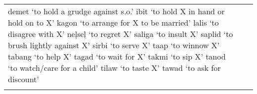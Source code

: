 \begin{table}
{\begin{tabular} {
        >{\RaggedRight\arraybackslash}p{4.55cm}
        >{\RaggedRight\arraybackslash}p{4.1cm}
        >{\RaggedRight\arraybackslash}p{4.2cm}
                    }
demet ‘to hold a grudge against s.o.’\newline 
ibit ‘to hold X in hand or hold on to X’\newline 
kagon ‘to arrange for X to be married’\newline 
lalis ‘to disagree with X’\newline 
neļseļ ‘to regret X’\newline 
saliga ‘to insult X’\newline 
saplid ‘to brush lightly against X’\newline 
sirbi ‘to serve X’\newline 
taap ‘to winnow X’\newline 
tabang ‘to help X’\newline 
tagad ‘to wait for X’\newline 
takmi ‘to sip X’\newline 
tanod ‘to watch/care for a child’\newline 
tilaw ‘to taste X’\newline 
tawad ‘to ask for discount’ \\ %
\lspbottomrule
\end{tabular}
    }     %
\end{table}

